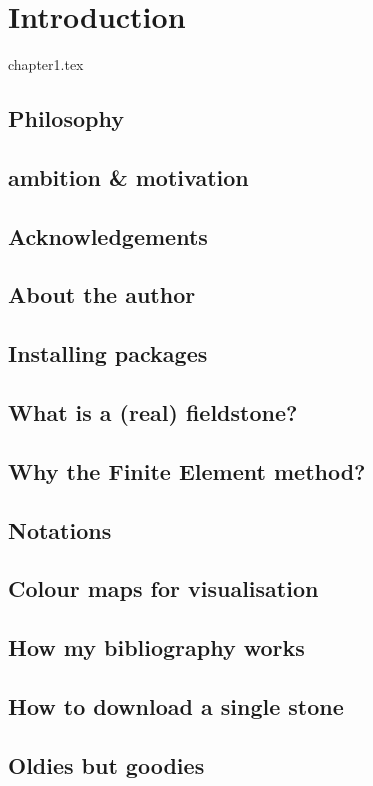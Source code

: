 \chapter{Introduction} %

\begin{flushright} {\tiny {\color{gray} chapter1.tex}} \end{flushright}

\section{Philosophy}  %
\section{ambition \& motivation}  %
\section{Acknowledgements}  %
\section{About the author}  %
\section{Installing packages}  %
\section{What is a (real) fieldstone?}  %
\section{Why the Finite Element method?}  %
\section{Notations}  %
\section{Colour maps for visualisation}  %
\section{How my bibliography works}  %
\section{How to download a single stone}  %
\section{Oldies but goodies}  %
